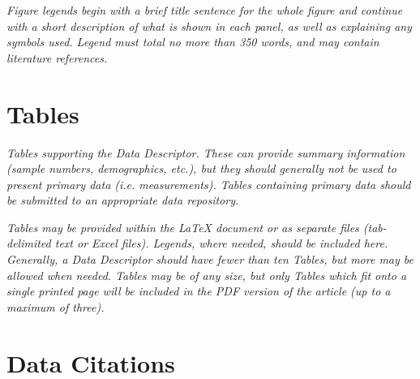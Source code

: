 \documentclass[english]{article}
\begin{document}
\emph{Figure legends begin with a brief title sentence for the whole figure
and continue with a short description of what is shown in each panel,
as well as explaining any symbols used. Legend must total no more
than 350 words, and may contain literature references.}

\section*{Tables}

\emph{Tables supporting the Data Descriptor. These can provide summary information
(sample numbers, demographics, etc.), but they should generally not
be used to present primary data (i.e. measurements). Tables containing
primary data should be submitted to an appropriate data repository.}

\emph{Tables may be provided within the \LaTeX{} document or as separate
files (tab-delimited text or Excel files). Legends, where needed,
should be included here. Generally, a Data Descriptor should have
fewer than ten Tables, but more may be allowed when needed. Tables
may be of any size, but only Tables which fit onto a single printed
page will be included in the PDF version of the article (up to a maximum
of three).}

{\small
}

%
%

\section{Data Citations}
\end{document}
